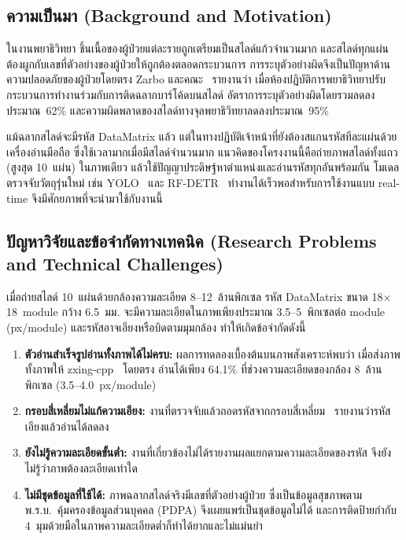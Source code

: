 \documentclass[20pt,a4paper]{article}
\begin{document}
\subsection{ความเป็นมา
(Background and Motivation)}

ในงานพยาธิวิทยา ชิ้นเนื้อของผู้ป่วยแต่ละรายถูกเตรียมเป็นสไลด์แก้วจำนวนมาก
และสไลด์ทุกแผ่นต้องผูกกับเลขที่ตัวอย่างของผู้ป่วยให้ถูกต้องตลอดกระบวนการ
การระบุตัวอย่างผิดจึงเป็นปัญหาด้านความปลอดภัยของผู้ป่วยโดยตรง
Zarbo และคณะ~\cite{zarbo2009henryford} รายงานว่า
เมื่อห้องปฏิบัติการพยาธิวิทยาปรับกระบวนการทำงานร่วมกับการติดฉลากบาร์โค้ดบนสไลด์
อัตราการระบุตัวอย่างผิดโดยรวมลดลงประมาณ~62\%
และความผิดพลาดของสไลด์ทางจุลพยาธิวิทยาลดลงประมาณ~95\%

แม้ฉลากสไลด์จะมีรหัส DataMatrix แล้ว
แต่ในทางปฏิบัติเจ้าหน้าที่ยังต้องสแกนรหัสทีละแผ่นด้วยเครื่องอ่านมือถือ
ซึ่งใช้เวลามากเมื่อมีสไลด์จำนวนมาก
แนวคิดของโครงงานนี้คือถ่ายภาพสไลด์ทั้งแถว (สูงสุด 10~แผ่น) ในภาพเดียว
แล้วใช้ปัญญาประดิษฐ์หาตำแหน่งและอ่านรหัสทุกอันพร้อมกัน
โมเดลตรวจจับวัตถุรุ่นใหม่ เช่น YOLO~\cite{khanam2024yolov11,sapkota2025yolo26}
และ RF-DETR~\cite{robinson2026rfdetr}
ทำงานได้เร็วพอสำหรับการใช้งานแบบ real-time
จึงมีศักยภาพที่จะนำมาใช้กับงานนี้

\subsection{ปัญหาวิจัยและข้อจำกัดทางเทคนิค
(Research Problems and Technical Challenges)}

เมื่อถ่ายสไลด์ 10~แผ่นด้วยกล้องความละเอียด 8--12~ล้านพิกเซล
รหัส DataMatrix ขนาด 18$\times$18~module กว้าง 6.5~มม.
จะมีความละเอียดในภาพเพียงประมาณ 3.5--5~พิกเซลต่อ module (px/module)
และรหัสอาจเอียงหรือบิดตามมุมกล้อง
ทำให้เกิดข้อจำกัดดังนี้

\begin{enumerate}
    \item \textbf{ตัวอ่านสำเร็จรูปอ่านทั้งภาพได้ไม่ครบ:}
    ผลการทดลองเบื้องต้นบนภาพสังเคราะห์พบว่า
    เมื่อส่งภาพทั้งภาพให้ zxing-cpp~\cite{zxingcpp} โดยตรง
    อ่านได้เพียง 64.1\% ที่ช่วงความละเอียดของกล้อง 8~ล้านพิกเซล (3.5--4.0~px/module)

    \item \textbf{กรอบสี่เหลี่ยมไม่แก้ความเอียง:}
    งานที่ตรวจจับแล้วถอดรหัสจากกรอบสี่เหลี่ยม~\cite{alsulami2026uav}
    รายงานว่ารหัสเอียงแล้วอ่านได้ลดลง

    \item \textbf{ยังไม่รู้ความละเอียดขั้นต่ำ:}
    งานที่เกี่ยวข้องไม่ได้รายงานผลแยกตามความละเอียดของรหัส
    จึงยังไม่รู้ว่าภาพต้องละเอียดเท่าใด

    \item \textbf{ไม่มีชุดข้อมูลที่ใช้ได้:}
    ภาพฉลากสไลด์จริงมีเลขที่ตัวอย่างผู้ป่วย
    ซึ่งเป็นข้อมูลสุขภาพตาม พ.ร.บ.~คุ้มครองข้อมูลส่วนบุคคล (PDPA)
    จึงเผยแพร่เป็นชุดข้อมูลไม่ได้
    และการติดป้ายกำกับ 4~มุมด้วยมือในภาพความละเอียดต่ำก็ทำได้ยากและไม่แม่นยำ
\end{enumerate}
\end{document}
